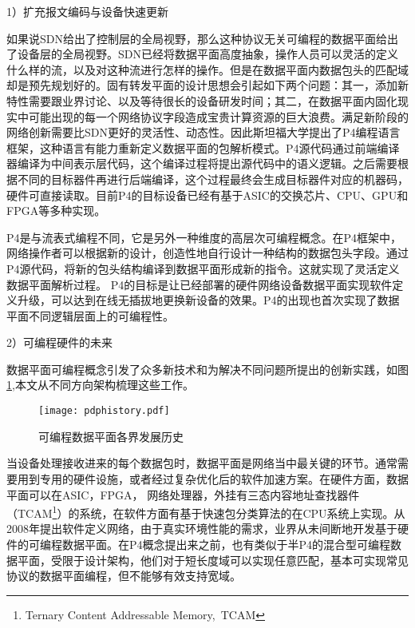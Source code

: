 

1）扩充报文编码与设备快速更新

如果说SDN给出了控制层的全局视野，那么这种协议无关可编程的数据平面给出了设备层的全局视野。SDN已经将数据平面高度抽象，操作人员可以灵活的定义什么样的流，以及对这种流进行怎样的操作。但是在数据平面内数据包头的匹配域却是预先规划好的。固有转发平面的设计思想会引起如下两个问题：其一，添加新特性需要跟业界讨论、以及等待很长的设备研发时间；其二，在数据平面内固化现实中可能出现的每一个网络协议字段造成宝贵计算资源的巨大浪费。满足新阶段的网络创新需要比SDN更好的灵活性、动态性。因此斯坦福大学提出了P4编程语言框架，这种语言有能力重新定义数据平面的包解析模式。P4源代码通过前端编译器编译为中间表示层代码，这个编译过程将提出源代码中的语义逻辑。之后需要根据不同的目标器件再进行后端编译，这个过程最终会生成目标器件对应的机器码，硬件可直接读取。目前P4的目标设备已经有基于ASIC的交换芯片、CPU、GPU和FPGA等多种实现。

P4是与流表式编程不同，它是另外一种维度的高层次可编程概念。在P4框架中，网络操作者可以根据新的设计，创造性地自行设计一种结构的数据包头字段。通过P4源代码，将新的包头结构编译到数据平面形成新的指令。这就实现了灵活定义数据平面解析过程。
P4的目标是让已经部署的硬件网络设备数据平面实现软件定义升级，可以达到在线无插拔地更换新设备的效果。P4的出现也首次实现了数据平面不同逻辑层面上的可编程性。

2）可编程硬件的未来

数据平面可编程概念引发了众多新技术和为解决不同问题所提出的创新实践，如图\ref{pdphistory},本文从不同方向架构梳理这些工作。

\begin{figure}[!ht]
	\centering
	\texttt{[image: pdphistory.pdf]}
	\caption{可编程数据平面各界发展历史} \label{pdphistory}
\end{figure}

当设备处理接收进来的每个数据包时，数据平面是网络当中最关键的环节。通常需要用到专用的硬件设施，或者经过复杂优化后的软件加速方案。在硬件方面，数据平面可以在ASIC，FPGA， 网络处理器，外挂有三态内容地址查找器件（TCAM\footnote{Ternary Content Addressable Memory,~TCAM}）的系统，在软件方面有基于快速包分类算法的在CPU系统上实现。从2008年提出软件定义网络，由于真实环境性能的需求，业界从未间断地开发基于硬件的可编程数据平面。在P4概念提出来之前，也有类似于半P4的混合型可编程数据平面，受限于设计架构，他们对于短长度域可以实现任意匹配，基本可实现常见协议的数据平面编程，但不能够有效支持宽域。

